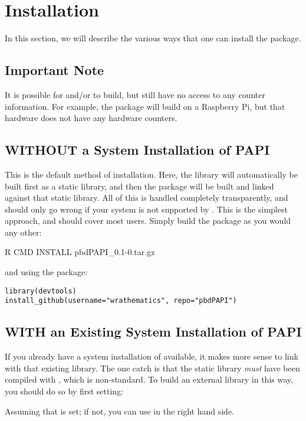 \section{Installation}
\label{sec:installation}

In this section, we will describe the various ways that one can install the 
\thispackage package.


\subsection{Important Note}

It is possible for \PAPI and/or \thispackage to build, but still have no access
to any counter information.  For example, the package will build on a Raspberry 
Pi, but that hardware does not have any hardware counters.




\subsection{WITHOUT a System Installation of PAPI}

This is the default method of installation.  Here, the \PAPI library will  
automatically be built first as a static library, and then the \thispackage 
package will be built and linked against that static library.  All of this is 
handled completely transparently, and should only go wrong if your system is not 
supported by \PAPI.  This is the simplest approach, and should cover most users. 
 Simply build the package as you would any other:
\begin{Command}
R CMD INSTALL pbdPAPI_0.1-0.tar.gz
\end{Command}
and using the  package:
\begin{lstlisting}
library(devtools)
install_github(username="wrathematics", repo="pbdPAPI")
\end{lstlisting}




\subsection{WITH an Existing System Installation of PAPI}

If you already have a system installation of \PAPI available, it makes more  
sense to link with that existing library.  The one catch is that the static 
library \emph{must} have been compiled with , which is non-standard. 
 To build an external \PAPI library in this way, you should do so by first 
setting:
Assuming that  is set; if not, you can use  in the right hand 
side.

